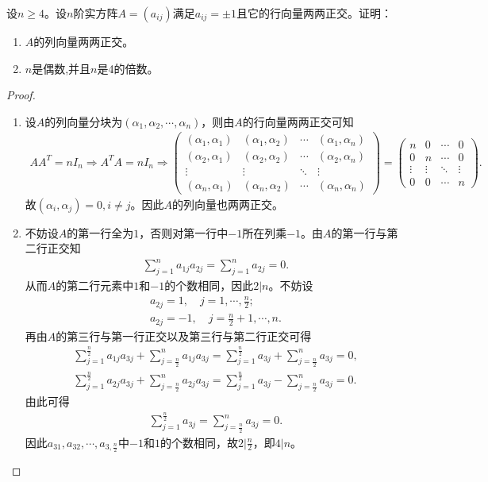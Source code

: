 \documentclass[../../main.tex]{subfiles}
\begin{document}
\begin{example}
设$n \geqslant 4$。设$n$阶实方阵$A = (a_{ij})$满足$a_{ij} = \pm 1$且它的行向量两两正交。证明：
\begin{enumerate}[(1)]
\item $A$的列向量两两正交。

\item $n$是偶数,并且$n$是4的倍数。
\end{enumerate}
\end{example}
\begin{proof}
\begin{enumerate}[(1)]
\item 设$A$的列向量分块为$(\alpha_1,\alpha_2,\cdots,\alpha_n)$，则由$A$的行向量两两正交可知
\begin{align*}
AA^T=nI_n\Longrightarrow A^TA=nI_n\Longrightarrow \begin{pmatrix}
(\alpha_1,\alpha_1) & (\alpha_1,\alpha_2) & \cdots & (\alpha_1,\alpha_n) \\
(\alpha_2,\alpha_1) & (\alpha_2,\alpha_2) & \cdots & (\alpha_2,\alpha_n) \\
\vdots & \vdots & \ddots & \vdots \\
(\alpha_n,\alpha_1) & (\alpha_n,\alpha_2) & \cdots & (\alpha_n,\alpha_n)
\end{pmatrix} = \begin{pmatrix}
n & 0 & \cdots & 0 \\
0 & n & \cdots & 0 \\
\vdots & \vdots & \ddots & \vdots \\
0 & 0 & \cdots & n
\end{pmatrix}.
\end{align*}
故$(\alpha_i,\alpha_j)=0,i\ne j$。因此$A$的列向量也两两正交。

\item 不妨设$A$的第一行全为$1$，否则对第一行中$-1$所在列乘$-1$。由$A$的第一行与第二行正交知
\begin{align*}
\sum_{j=1}^n a_{1j}a_{2j} = \sum_{j=1}^n a_{2j} = 0.
\end{align*}
从而$A$的第二行元素中$1$和$-1$的个数相同，因此$2|n$。不妨设
\begin{gather*}
a_{2j}=1,\quad j=1,\cdots,\frac{n}{2}; \\
a_{2j}=-1,\quad j=\frac{n}{2}+1,\cdots,n.
\end{gather*}
再由$A$的第三行与第一行正交以及第三行与第二行正交可得
\begin{align*}
\sum_{j=1}^{\frac{n}{2}} a_{1j}a_{3j} + \sum_{j=\frac{n}{2}}^n a_{1j}a_{3j} = \sum_{j=1}^{\frac{n}{2}} a_{3j} + \sum_{j=\frac{n}{2}}^n a_{3j} = 0, \\
\sum_{j=1}^{\frac{n}{2}} a_{2j}a_{3j} + \sum_{j=\frac{n}{2}}^n a_{2j}a_{3j} = \sum_{j=1}^{\frac{n}{2}} a_{3j} - \sum_{j=\frac{n}{2}}^n a_{3j} = 0.
\end{align*}
由此可得
\begin{align*}
\sum_{j=1}^{\frac{n}{2}} a_{3j} = \sum_{j=\frac{n}{2}}^n a_{3j} = 0.
\end{align*}
因此$a_{31},a_{32},\cdots,a_{3,\frac{n}{2}}$中$-1$和$1$的个数相同，故$2|\frac{n}{2}$，即$4|n$。
\end{enumerate}

\end{proof}
\end{document}
